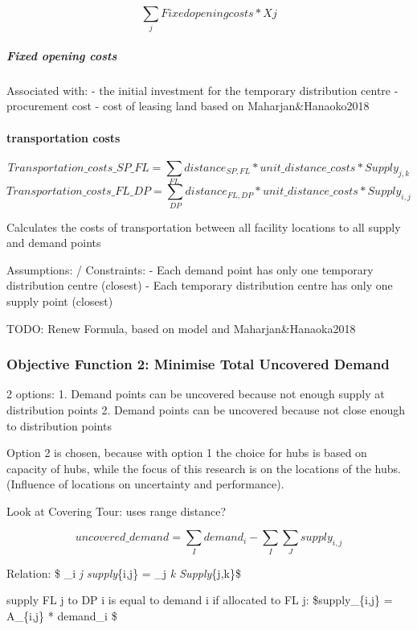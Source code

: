 \documentclass[11pt]{article}
\begin{document}
\[\sum_{j} Fixed opening costs * Xj \]

\subparagraph{Fixed opening costs}\label{fixed-opening-costs}

Associated with: - the initial investment for the temporary distribution
centre - procurement cost - cost of leasing land based on
Maharjan\&Hanaoko2018

\paragraph{transportation costs}\label{transportation-costs}

\[Transportation\_costs\_SP\_FL=\sum_{FL} distance_{SP,FL} * unit\_distance\_costs * Supply_{j,k}\]
\[Transportation\_costs\_FL\_DP=\sum_{DP} distance_{FL,DP} * unit\_distance\_costs * Supply_{i,j}\]

Calculates the costs of transportation between all facility locations to
all supply and demand points

Assumptions: / Constraints: - Each demand point has only one temporary
distribution centre (closest) - Each temporary distribution centre has
only one supply point (closest)

TODO: Renew Formula, based on model and Maharjan\&Hanaoka2018

    \subsubsection{Objective Function 2: Minimise Total Uncovered
Demand}\label{objective-function-2-minimise-total-uncovered-demand}

2 options: 1. Demand points can be uncovered because not enough supply
at distribution points 2. Demand points can be uncovered because not
close enough to distribution points

Option 2 is chosen, because with option 1 the choice for hubs is based
on capacity of hubs, while the focus of this research is on the
locations of the hubs. (Influence of locations on uncertainty and
performance).

Look at Covering Tour: uses range distance?

    \[
uncovered\_demand = \sum_{I} demand_{i} - \sum_{I} \sum_{J} supply_{i,j}
\]

Relation: \$ \sum\_i \sum\emph{j supply}\{i,j\} = \sum\_j \sum\emph{k
Supply}\{j,k\}\$

supply FL j to DP i is equal to demand i if allocated to FL j:
\$supply\_\{i,j\} = A\_\{i,j\} * demand\_i \$
\end{document}
